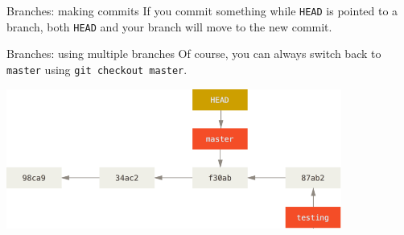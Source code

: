 \documentclass{beeper}
\begin{document}
\begin{frame}{Branches: making commits}
    If you commit something while \texttt{HEAD} is pointed to a branch, both
    \texttt{HEAD} and your branch will move to the new commit.

\end{frame}

\begin{frame}{Branches: using multiple branches}
    Of course, you can always switch back to \texttt{master} using \texttt{git
    checkout master}.

    \begin{center}
        \includegraphics[width=110mm]{graphics/branching4}
    \end{center}
\end{frame}
\end{document}
